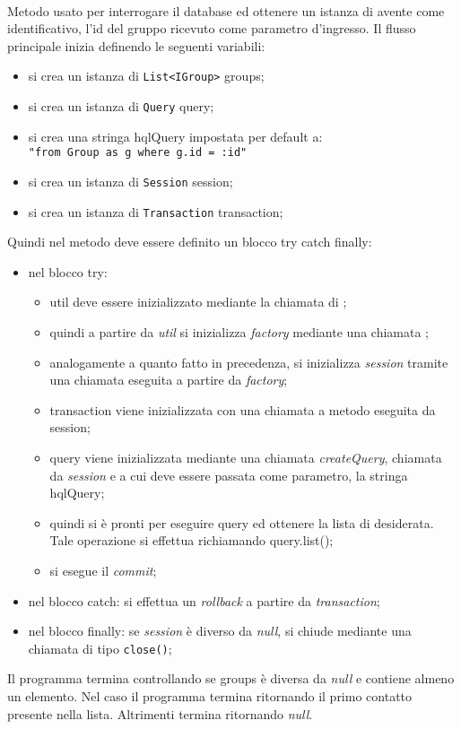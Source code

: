 \begin{description}
	\item{}\\
	Metodo usato per interrogare il database ed ottenere un istanza di  avente come identificativo, l'id del gruppo ricevuto come parametro d'ingresso. Il flusso principale inizia definendo le seguenti variabili:
	\begin{itemize}
		\item si crea un istanza di \texttt{List<IGroup>} groups;
		\item si crea un istanza di \texttt{Query} query;
		\item si crea una stringa hqlQuery impostata per default a:\\
			\verb|"from Group as g where g.id = :id"|
		\item si crea un istanza di \texttt{Session} session;
		\item si crea un istanza di \texttt{Transaction} transaction;
	\end{itemize}
	Quindi nel metodo deve essere definito un blocco try catch finally:
	\begin{itemize}
		\item nel blocco try:
		\begin{itemize}
			\item util deve essere inizializzato mediante la chiamata  di ;
			\item quindi a partire da \textit{util} si inizializza \textit{factory} mediante una chiamata ;
			\item analogamente a quanto fatto in precedenza, si inizializza \textit{session} tramite una chiamata  eseguita a partire da \textit{factory};
			\item transaction viene inizializzata con una chiamata a metodo  eseguita da session;
			\item query viene inizializzata mediante una chiamata \textit{createQuery}, chiamata da \textit{session} e a cui deve essere passata come parametro, la stringa hqlQuery;
			\item quindi si è pronti per eseguire query ed ottenere la lista di  desiderata. Tale operazione si effettua richiamando query.list();
			\item si esegue il \textit{commit};
		\end{itemize}
		\item nel blocco catch: si effettua un \textit{rollback} a partire da \textit{transaction};
		\item nel blocco finally: se \textit{session} è diverso da \textit{null}, si chiude mediante una chiamata di tipo \texttt{close()};
	\end{itemize}
	Il programma termina controllando se groups è diversa da \textit{null} e contiene almeno un elemento. Nel caso il programma termina ritornando il primo contatto presente nella lista. Altrimenti termina ritornando \textit{null}.
	

\end{description}

